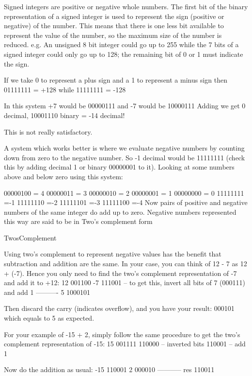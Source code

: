 Signed integers are positive or negative whole numbers. The first bit of the binary representation of a signed integer is used to represent the sign (positive or negative) of the number. This means that there is one less bit available to represent the value of the number, so the maximum size of the number is reduced. 
e.g. An unsigned 8 bit integer could go up to 255 while the 7 bits of a signed integer could only go up to 128; the remaining bit of 0 or 1 must indicate the sign. 

If we take 0 to represent a plus sign and a 1 to represent a minus sign then 01111111 = +128 while 11111111 = -128 


In this system +7  would be 00000111 
and -7  would be 10000111 
Adding we get   0  decimal, 10001110 binary = -14 decimal! 

This is not really satisfactory. 


A system which works better is where we evaluate negative numbers by counting down from zero to the negative number. So -1 decimal would be 11111111 (check this by adding decimal 1 or binary 00000001 to it). 
Looking at some numbers above and below zero using this system: 

00000100 = 4
 00000011 = 3
 00000010 = 2
 00000001 = 1
 00000000 = 0
 11111111 =-1
 11111110 =-2
 11111101 =-3
 11111100 =-4 
 Now pairs of positive and negative numbers of the same integer do add up to zero. Negative numbers represented this way are said to be in Two's complement form
 

TwosComplement

Using two's complement to represent negative values has the benefit that subtraction and addition are the same. In your case, you can think of 12 - 7 as 12 + (-7). Hence you only need to find the two's complement representation of -7 and add it to +12:
12  001100
-7  111001   -- to get this, invert all bits of 7 (000111) and add 1
----------
 5 1000101


Then discard the carry (indicates overflow), and you have your result: 000101 which equals to 5 as expected.

For your example of -15 + 2, simply follow the same procedure to get the two's complement representation of -15:
15  001111
    110000   -- inverted bits
    110001   -- add 1


Now do the addition as usual:
-15  110001
  2  000010
-----------
res  110011


